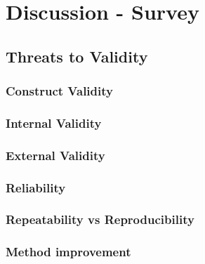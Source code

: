 \section{Discussion - Survey}

\subsection{Threats to Validity}  

\subsubsection{Construct Validity}

\subsubsection{Internal Validity}

\subsubsection{External Validity}

\subsubsection{Reliability}

\subsubsection{Repeatability vs Reproducibility}

\subsubsection{Method improvement}
